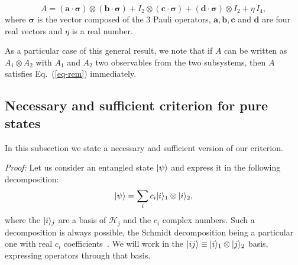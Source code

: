 \[ A = (\mathbf{a}\cdot\boldsymbol{\sigma})  \otimes  (\mathbf{b}\cdot\boldsymbol{\sigma})  + I_2 \otimes (\mathbf{c}\cdot\boldsymbol{\sigma}) + (\mathbf{d}\cdot\boldsymbol{\sigma} ) \otimes I_2 +\eta \, I_4 ,\]
where $\boldsymbol{\sigma}$ is the vector composed of the 3 Pauli operators,  $\mathbf{a}, \mathbf{b}, \mathbf{c}$ and $\mathbf{d}$ are
four real vectors and $\eta$ is a real number.

As a particular case of this general result, we note that if $A$ can be written as $A_1 \otimes A_2$ with $A_1$ and $A_2$ two observables from the two subsystems, then $A$ satisfies Eq.~(\ref{eq-rem}) immediately.

\subsection{Necessary and sufficient criterion for pure states}

In this subsection we state a necessary and sufficient version of our criterion.


\emph{Proof:} Let us consider an entangled state $| \psi \rangle$ and express it in the following decomposition:
\[ | \psi \rangle=\sum_i c_i | i \rangle_1\otimes | i \rangle_2,\]
where the $| i \rangle_j$ are a basis of $\mathcal{H}_j$ and the $c_i$ complex numbers. Such a decomposition is always possible, the Schmidt decomposition being a particular one with real $c_i$ coefficients~\cite{Min05}.
We will work in the $| ij \rangle \equiv | i \rangle_1\otimes | j \rangle_2$ basis, expressing operators through that basis.


